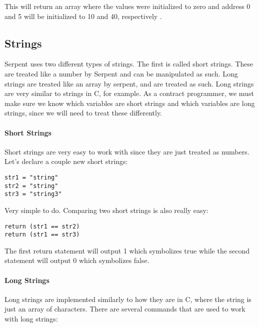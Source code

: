 \documentclass[12pt]{article}
\begin{document}
This will return an array where the values were initialized to zero and address 0 and 5 will be initialized to 10 and 40, respectively \cite{Serpent}. 

\subsection{Strings}
	Serpent uses two different types of strings. The first is called short strings. These are treated like a number by Serpent and can be manipulated as such. Long strings are treated like an array by serpent, and are treated as such. Long strings are very similar to strings in C, for example. As a contract programmer, we must make sure we know which variables are short strings and which variables are long strings, since we will need to treat these differently. \cite{Serpent}

\paragraph{Short Strings}
	Short strings are very easy to work with since they are just treated as numbers. Let's declare a couple new short strings:
	
\begin{verbatim}
str1 = "string"
str2 = "string"
str3 = "string3"
\end{verbatim}

Very simple to do. Comparing two short strings is also really easy:

\begin{verbatim}
return (str1 == str2)
return (str1 == str3)
\end{verbatim}

The first return statement will output 1 which symbolizes true while the second statement will output 0 which symbolizes false. \cite{Serpent}

\paragraph{Long Strings}
Long strings are implemented similarly to how they are in C, where the string is just an array of characters. There are several commands that are used to work with long strings:
\end{document}
